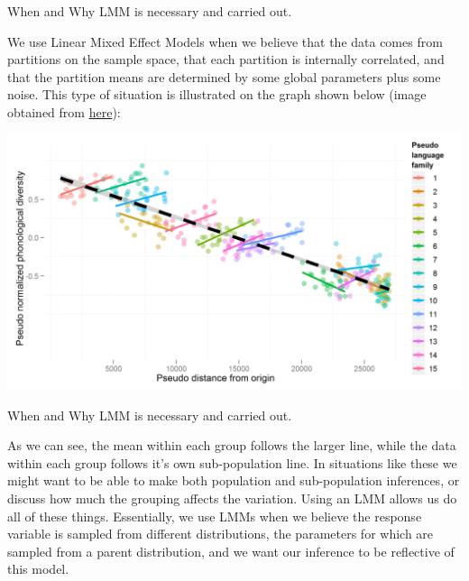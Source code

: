 \documentclass[ignorenonframetext,]{beamer}
\begin{document}
\begin{frame}{When and Why LMM is necessary and carried out.}

We use Linear Mixed Effect Models when we believe that the data comes
from partitions on the sample space, that each partition is internally
correlated, and that the partition means are determined by some global
parameters plus some noise. This type of situation is illustrated on the
graph shown below (image obtained from
\href{https://hlplab.wordpress.com/2011/05/31/mixed-models-and-simpsons-paradox/}{here}):

\includegraphics{situation.png}

\end{frame}

\begin{frame}{When and Why LMM is necessary and carried out.}

As we can see, the mean within each group follows the larger line, while
the data within each group follows it's own sub-population line. In
situations like these we might want to be able to make both population
and sub-population inferences, or discuss how much the grouping affects
the variation. Using an LMM allows us do all of these things.
Essentially, we use LMMs when we believe the response variable is
sampled from different distributions, the parameters for which are
sampled from a parent distribution, and we want our inference to be
reflective of this model.

\end{frame}
\end{document}
